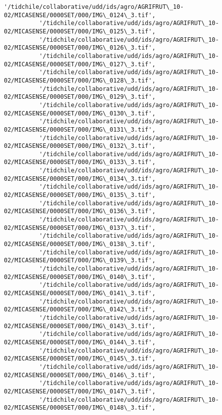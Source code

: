 \documentclass[11pt]{article}
\begin{document}
\begin{Verbatim}[commandchars=\\\{\}]
          '/tidchile/collaborative/udd/ids/agro/AGRIFRUT\_10-02/MICASENSE/0000SET/000/IMG\_0124\_3.tif',
          '/tidchile/collaborative/udd/ids/agro/AGRIFRUT\_10-02/MICASENSE/0000SET/000/IMG\_0125\_3.tif',
          '/tidchile/collaborative/udd/ids/agro/AGRIFRUT\_10-02/MICASENSE/0000SET/000/IMG\_0126\_3.tif',
          '/tidchile/collaborative/udd/ids/agro/AGRIFRUT\_10-02/MICASENSE/0000SET/000/IMG\_0127\_3.tif',
          '/tidchile/collaborative/udd/ids/agro/AGRIFRUT\_10-02/MICASENSE/0000SET/000/IMG\_0128\_3.tif',
          '/tidchile/collaborative/udd/ids/agro/AGRIFRUT\_10-02/MICASENSE/0000SET/000/IMG\_0129\_3.tif',
          '/tidchile/collaborative/udd/ids/agro/AGRIFRUT\_10-02/MICASENSE/0000SET/000/IMG\_0130\_3.tif',
          '/tidchile/collaborative/udd/ids/agro/AGRIFRUT\_10-02/MICASENSE/0000SET/000/IMG\_0131\_3.tif',
          '/tidchile/collaborative/udd/ids/agro/AGRIFRUT\_10-02/MICASENSE/0000SET/000/IMG\_0132\_3.tif',
          '/tidchile/collaborative/udd/ids/agro/AGRIFRUT\_10-02/MICASENSE/0000SET/000/IMG\_0133\_3.tif',
          '/tidchile/collaborative/udd/ids/agro/AGRIFRUT\_10-02/MICASENSE/0000SET/000/IMG\_0134\_3.tif',
          '/tidchile/collaborative/udd/ids/agro/AGRIFRUT\_10-02/MICASENSE/0000SET/000/IMG\_0135\_3.tif',
          '/tidchile/collaborative/udd/ids/agro/AGRIFRUT\_10-02/MICASENSE/0000SET/000/IMG\_0136\_3.tif',
          '/tidchile/collaborative/udd/ids/agro/AGRIFRUT\_10-02/MICASENSE/0000SET/000/IMG\_0137\_3.tif',
          '/tidchile/collaborative/udd/ids/agro/AGRIFRUT\_10-02/MICASENSE/0000SET/000/IMG\_0138\_3.tif',
          '/tidchile/collaborative/udd/ids/agro/AGRIFRUT\_10-02/MICASENSE/0000SET/000/IMG\_0139\_3.tif',
          '/tidchile/collaborative/udd/ids/agro/AGRIFRUT\_10-02/MICASENSE/0000SET/000/IMG\_0140\_3.tif',
          '/tidchile/collaborative/udd/ids/agro/AGRIFRUT\_10-02/MICASENSE/0000SET/000/IMG\_0141\_3.tif',
          '/tidchile/collaborative/udd/ids/agro/AGRIFRUT\_10-02/MICASENSE/0000SET/000/IMG\_0142\_3.tif',
          '/tidchile/collaborative/udd/ids/agro/AGRIFRUT\_10-02/MICASENSE/0000SET/000/IMG\_0143\_3.tif',
          '/tidchile/collaborative/udd/ids/agro/AGRIFRUT\_10-02/MICASENSE/0000SET/000/IMG\_0144\_3.tif',
          '/tidchile/collaborative/udd/ids/agro/AGRIFRUT\_10-02/MICASENSE/0000SET/000/IMG\_0145\_3.tif',
          '/tidchile/collaborative/udd/ids/agro/AGRIFRUT\_10-02/MICASENSE/0000SET/000/IMG\_0146\_3.tif',
          '/tidchile/collaborative/udd/ids/agro/AGRIFRUT\_10-02/MICASENSE/0000SET/000/IMG\_0147\_3.tif',
          '/tidchile/collaborative/udd/ids/agro/AGRIFRUT\_10-02/MICASENSE/0000SET/000/IMG\_0148\_3.tif',

\end{Verbatim}
\end{document}
